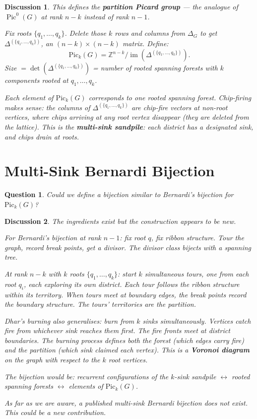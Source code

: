 \documentclass[11pt]{article}
\newcommand{\Z}{\mathbb{Z}}
\newcommand{\Pic}{\operatorname{Pic}^0}
\newtheorem{question}{Question}
\newtheorem{answer}{Discussion}
\begin{document}
\begin{answer}
This defines the \textbf{partition Picard group} --- the analogue of $\Pic(G)$
at rank $n-k$ instead of rank $n-1$.

Fix roots $\{q_1, \ldots, q_k\}$. Delete those $k$ rows and columns from
$\Delta_G$ to get $\Delta^{(\{q_1,\ldots,q_k\})}$, an $(n-k) \times (n-k)$
matrix. Define:
\[
  \mathrm{Pic}_k(G) = \Z^{n-k} /
    \operatorname{im}(\Delta^{(\{q_1,\ldots,q_k\})}).
\]
Size $= \det(\Delta^{(\{q_1,\ldots,q_k\})})$ = number of rooted spanning
forests with $k$ components rooted at $q_1, \ldots, q_k$.

Each element of $\mathrm{Pic}_k(G)$ corresponds to one rooted spanning forest.
Chip-firing makes sense: the columns of $\Delta^{(\{q_1,\ldots,q_k\})}$ are
chip-fire vectors at non-root vertices, where chips arriving at any root vertex
disappear (they are deleted from the lattice). This is the
\textbf{multi-sink sandpile}: each district has a designated sink, and chips
drain at roots.
\end{answer}


\section{Multi-Sink Bernardi Bijection}

\begin{question}
Could we define a bijection similar to Bernardi's bijection for
$\mathrm{Pic}_k(G)$?
\end{question}

\begin{answer}
The ingredients exist but the construction appears to be new.

For Bernardi's bijection at rank $n-1$: fix root $q$, fix ribbon structure.
Tour the graph, record break points, get a divisor. The divisor class bijects
with a spanning tree.

At rank $n-k$ with $k$ roots $\{q_1, \ldots, q_k\}$: start $k$ simultaneous
tours, one from each root $q_i$, each exploring its own district. Each tour
follows the ribbon structure within its territory. When tours meet at boundary
edges, the break points record the boundary structure. The tours' territories
\emph{are} the partition.

Dhar's burning also generalises: burn from $k$ sinks simultaneously. Vertices
catch fire from whichever sink reaches them first. The fire fronts meet at
district boundaries. The burning process defines both the forest (which edges
carry fire) and the partition (which sink claimed each vertex). This is a
\textbf{Voronoi diagram} on the graph with respect to the $k$ root vertices.

The bijection would be: recurrent configurations of the $k$-sink sandpile
$\leftrightarrow$ rooted spanning forests $\leftrightarrow$ elements of
$\mathrm{Pic}_k(G)$.

As far as we are aware, a published multi-sink Bernardi bijection does not
exist. This could be a new contribution.
\end{answer}
\end{document}
